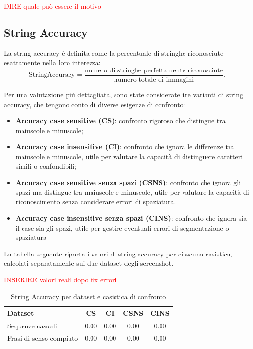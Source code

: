 \textcolor{red}{DIRE quale può essere il motivo}

\subsection{String Accuracy}
La string accuracy è definita come la percentuale di stringhe riconosciute esattamente nella loro interezza:
\[
    \mathrm{StringAccuracy} = \frac{\text{numero di stringhe perfettamente riconosciute}}{\text{numero totale di immagini}}.
\]

Per una valutazione più dettagliata, sono state considerate tre varianti di string accuracy, che tengono conto di diverse esigenze di confronto:

\begin{itemize}
    \item \textbf{Accuracy case sensitive (CS)}: confronto rigoroso che distingue tra maiuscole e minuscole;
    \item \textbf{Accuracy case insensitive (CI)}: confronto che ignora le differenze tra maiuscole e minuscole, utile per valutare la capacità di distinguere caratteri simili o confondibili;
    \item \textbf{Accuracy case sensitive senza spazi (CSNS)}: confronto che ignora gli spazi ma distingue tra maiuscole e minuscole, utile per valutare la capacità di riconoscimento senza considerare errori di spaziatura.
    \item \textbf{Accuracy case insensitive senza spazi (CINS)}: confronto che ignora sia il case sia gli spazi, utile per gestire eventuali errori di segmentazione o spaziatura

\end{itemize}

La tabella seguente riporta i valori di string accuracy per ciascuna casistica, calcolati separatamente sui due dataset degli screenshot.

\textcolor{red}{INSERIRE valori reali dopo fix errori}

\begin{table}[htbp]
    \centering
    \begin{tabular}{lcccc}
        \toprule
        Dataset                 & CS & CI & CSNS & CINS \\
        \midrule
        Sequenze casuali        & 0.00 & 0.00 & 0.00 & 0.00 \\
        Frasi di senso compiuto & 0.00 & 0.00 & 0.00 & 0.00 \\
        \bottomrule
    \end{tabular}
    \caption{String Accuracy per dataset e casistica di confronto}
    \label{tab:string_accuracy_stats}
\end{table}
